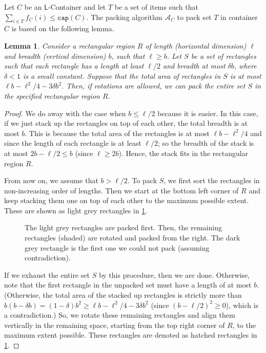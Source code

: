 \documentclass[10pt,a4paper]{amsart}
\newcommand{\mt}[1]{#1}
\newtheorem{lemma}[theorem]{Lemma}
\theoremstyle{definition}
\newcommand{\LContainer}{$\mathsf{L}$-Container}
\begin{document}
Let $C$ be an \LContainer{} and let $T$ be a set of items such that $\sum_{i\in T}f_C(i)\le \mathtt{cap}(C)$.
The packing algorithm $\mathcal A_C$ to pack set $T$ in container $C$ is based on the following lemma.
\begin{lemma}
\label{pack-sheets}
Consider a rectangular region $R$ of length (horizontal dimension) $\ell$ and breadth (vertical dimension) $b$, such that $\ell\ge b$.
Let $S$ be a set of rectangles such that each rectangle has a length at least $\ell/2$ and breadth at most $\delta b$, where $\delta<1$ is a small constant. Suppose that the total area of rectangles in $S$ is at most $\ell b-\ell^2/4-3\delta b^2$.
Then, if rotations are allowed, we can pack the entire set $S$ in the specified rectangular region $R$.
\end{lemma}
\begin{proof}
We do away with the case when $b\le \ell/2$ because \mt{it is} easier. In this case, if we just stack up the rectangles on top of each other,
the total breadth is at most $b$. This is because the total area of the rectangles is at most $\ell b-\ell^2/4$ and
since the length of each rectangle is at least $\ell/2$; so the breadth of the stack is at most $2b-\ell/2\le b$ (since $\ell \ge 2b$).
Hence, the stack fits in the rectangular region $R$.

From now on, we assume that $b>\ell/2$. To pack $S$, we first sort the rectangles in non-increasing order of lengths. 
Then we start at the bottom left corner of $R$ and keep stacking them
one on top of each other to the maximum possible extent. These are shown as light grey rectangles in \cref{fig:stack-up}.
\begin{figure}[ht]
\begin{center}

\end{center}
\caption{The light grey rectangles are packed first. Then, the remaining rectangles (shaded) are rotated and packed from the right. The dark grey rectangle is the first one we could not pack (assuming contradiction).}
\label{fig:stack-up}
\end{figure}

If we exhaust the entire set $S$ by this procedure, then we are done. Otherwise, note that the first rectangle in the unpacked set must have a length of at most $b$. (Otherwise,
the total area of the stacked up rectangles is strictly more than $b(b-\delta b)=(1-\delta)b^2\ge \ell b-\ell^2/4-3\delta b^2$ (since $(b-\ell/2)^2\ge 0$), which is a contradiction.)
So, we rotate these remaining rectangles and align them vertically in the remaining space, starting from the top right corner of $R$, to the maximum extent possible.
These rectangles are denoted as hatched rectangles in \cref{fig:stack-up}.
% 


\end{proof}
\end{document}
